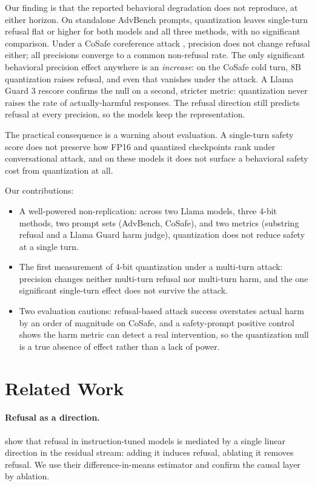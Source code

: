 \documentclass[letterpaper]{article} %
\begin{document}
Our finding is that the reported behavioral degradation does not reproduce, at
either horizon. On standalone AdvBench prompts, quantization leaves single-turn
refusal flat or higher for both models and all three methods, with no significant
comparison. Under a CoSafe coreference attack \citep{yu2024cosafe}, precision does
not change refusal either; all precisions converge to a common non-refusal rate.
The only significant behavioral precision effect anywhere is an \emph{increase}:
on the CoSafe cold turn, 8B quantization raises refusal, and even that vanishes
under the attack. A Llama Guard 3 rescore confirms the null on a second, stricter
metric: quantization never raises the rate of actually-harmful responses. The
refusal direction still predicts refusal at every precision, so the models keep
the representation.

The practical consequence is a warning about evaluation. A single-turn safety
score does not preserve how FP16 and quantized checkpoints rank under
conversational attack, and on these models it does not surface a behavioral safety
cost from quantization at all.

Our contributions:
\begin{itemize}
\item A well-powered non-replication: across two Llama models, three 4-bit
methods, two prompt sets (AdvBench, CoSafe), and two metrics (substring refusal
and a Llama Guard harm judge), quantization does not reduce safety at a single
turn.
\item The first measurement of 4-bit quantization under a multi-turn attack:
precision changes neither multi-turn refusal nor multi-turn harm, and the one
significant single-turn effect does not survive the attack.
\item Two evaluation cautions: refusal-based attack success overstates actual
harm by an order of magnitude on CoSafe, and a safety-prompt positive control
shows the harm metric can detect a real intervention, so the quantization null is
a true absence of effect rather than a lack of power.
\end{itemize}

\section{Related Work}
\paragraph{Refusal as a direction.}
\citet{arditi2024refusal} show that refusal in instruction-tuned models is
mediated by a single linear direction in the residual stream: adding it induces
refusal, ablating it removes refusal. We use their difference-in-means estimator
and confirm the causal layer by ablation.
\end{document}
